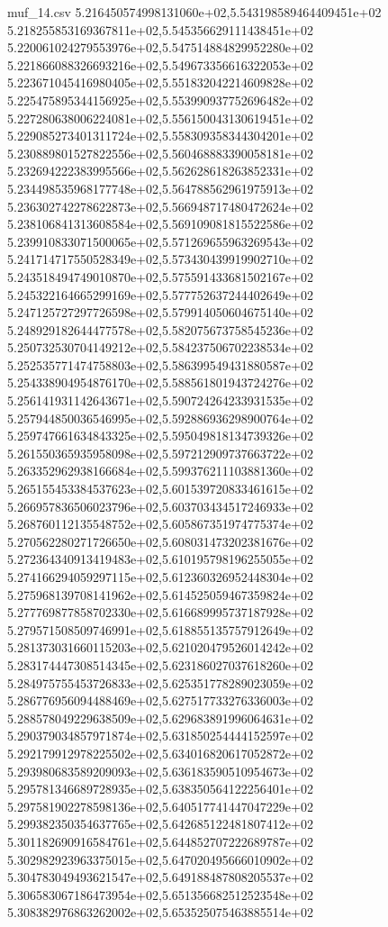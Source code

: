 \begin{filecontents*}{muf_14.csv}
5.216450574998131060e+02,5.543198589464409451e+02
5.218255853169367811e+02,5.545356629111438451e+02
5.220061024279553976e+02,5.547514884829952280e+02
5.221866088326693216e+02,5.549673356616322053e+02
5.223671045416980405e+02,5.551832042214609828e+02
5.225475895344156925e+02,5.553990937752696482e+02
5.227280638006224081e+02,5.556150043130619451e+02
5.229085273401311724e+02,5.558309358344304201e+02
5.230889801527822556e+02,5.560468883390058181e+02
5.232694222383995566e+02,5.562628618263852331e+02
5.234498535968177748e+02,5.564788562961975913e+02
5.236302742278622873e+02,5.566948717480472624e+02
5.238106841313608584e+02,5.569109081815522586e+02
5.239910833071500065e+02,5.571269655963269543e+02
5.241714717550528349e+02,5.573430439919902710e+02
5.243518494749010870e+02,5.575591433681502167e+02
5.245322164665299169e+02,5.577752637244402649e+02
5.247125727297726598e+02,5.579914050604675140e+02
5.248929182644477578e+02,5.582075673758545236e+02
5.250732530704149212e+02,5.584237506702238534e+02
5.252535771474758803e+02,5.586399549431880587e+02
5.254338904954876170e+02,5.588561801943724276e+02
5.256141931142643671e+02,5.590724264233931535e+02
5.257944850036546995e+02,5.592886936298900764e+02
5.259747661634843325e+02,5.595049818134739326e+02
5.261550365935958098e+02,5.597212909737663722e+02
5.263352962938166684e+02,5.599376211103881360e+02
5.265155453384537623e+02,5.601539720833461615e+02
5.266957836506023796e+02,5.603703434517246933e+02
5.268760112135548752e+02,5.605867351974775374e+02
5.270562280271726650e+02,5.608031473202381676e+02
5.272364340913419483e+02,5.610195798196255055e+02
5.274166294059297115e+02,5.612360326952448304e+02
5.275968139708141962e+02,5.614525059467359824e+02
5.277769877858702330e+02,5.616689995737187928e+02
5.279571508509746991e+02,5.618855135757912649e+02
5.281373031660115203e+02,5.621020479526014242e+02
5.283174447308514345e+02,5.623186027037618260e+02
5.284975755453726833e+02,5.625351778289023059e+02
5.286776956094488469e+02,5.627517733276336003e+02
5.288578049229638509e+02,5.629683891996064631e+02
5.290379034857971874e+02,5.631850254444152597e+02
5.292179912978225502e+02,5.634016820617052872e+02
5.293980683589209093e+02,5.636183590510954673e+02
5.295781346689728935e+02,5.638350564122256401e+02
5.297581902278598136e+02,5.640517741447047229e+02
5.299382350354637765e+02,5.642685122481807412e+02
5.301182690916584761e+02,5.644852707222689787e+02
5.302982923963375015e+02,5.647020495666010902e+02
5.304783049493621547e+02,5.649188487808205537e+02
5.306583067186473954e+02,5.651356682512523548e+02
5.308382976863262002e+02,5.653525075463885514e+02

\end{filecontents*}
